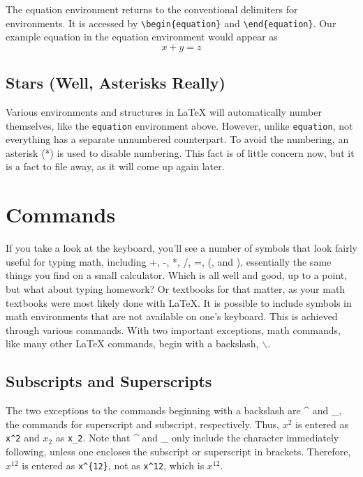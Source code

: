 The equation environment returns to the conventional delimiters for
environments.  It is accessed by \verb=\begin{equation}= and
\verb=\end{equation}=.  Our example equation in the equation
environment would appear as
\begin{equation}
  \label{eq:1}
  x+y=z
\end{equation}

\subsection{Stars (Well, Asterisks Really)}
\label{sec:stars-well-asterisks}

Various environments and structures in \LaTeX{} will automatically
number themselves, like the \texttt{equation} environment above.
However, unlike \texttt{equation}, not everything has a separate
unnumbered counterpart.  To avoid the numbering, an asterisk (*) is
used to disable numbering.  This fact is of little concern now, but it
is a fact to file away, as it will come up again later.

\section{Commands}
\label{sec:commands}

If you take a look at the keyboard, you'll see a number of symbols
that look fairly useful for typing math, including +, -, *, /, =, (,
and ), essentially the same things you find on a small calculator.
Which is all well and good, up to a point, but what about typing
homework?  Or textbooks for that matter, as your math textbooks were
most likely done with \LaTeX{}.  It is possible to include symbols in
math environments that are not available on one's keyboard.  This is
achieved through various commands.  With two important exceptions,
math commands, like many other \LaTeX{} commands, begin with a
backslash, $\backslash$.

\subsection{Subscripts and Superscripts}
\label{sec:subscr-superscr}

The two exceptions to the commands beginning with a backslash are \^{}
and \_, the commands for superscript and subscript, respectively.
Thus, $x^2$ is entered as \verb=x^2= and $x_2$ as \verb=x_2=.  Note
that \^{} and \_ only include the character immediately following,
unless one encloses the subscript or superscript in brackets.
Therefore, $x^{12}$ is entered as \verb=x^{12}=, not as \verb=x^12=,
which is $x^12$.


